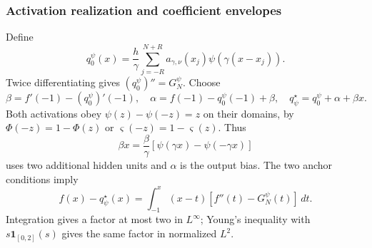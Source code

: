 \subsubsection{Activation realization and coefficient envelopes}
Define
\begin{equation}
 q_0^\psi(x)=\frac h\gamma\sum_{j=-R}^{N+R}
 a_{\gamma,\nu}(x_j)\psi(\gamma(x-x_j)).
 \label{eq:psi-q0}
\end{equation}
Twice differentiating gives $(q_0^\psi)''=G_N^\psi$. Choose
\begin{equation}
 \beta=f'(-1)-(q_0^\psi)'(-1),\quad
 \alpha=f(-1)-q_0^\psi(-1)+\beta,\quad
 q_\psi^\star=q_0^\psi+\alpha+\beta x.
 \label{eq:psi-anchor}
\end{equation}
Both activations obey $\psi(z)-\psi(-z)=z$ on their domains, by
$\Phi(-z)=1-\Phi(z)$ or $\varsigma(-z)=1-\varsigma(z)$.
Thus
\begin{equation}
 \beta x=\frac\beta\gamma[\psi(\gamma x)-\psi(-\gamma x)]
 \label{eq:psi-linear-identity}
\end{equation}
uses two additional hidden units and $\alpha$ is the output bias. The two
anchor conditions imply
\begin{equation}
 f(x)-q_\psi^\star(x)=\int_{-1}^x(x-t)[f''(t)-G_N^\psi(t)]\,dt.
 \label{eq:psi-lift-error}
\end{equation}
Integration gives a factor at most two in $L^\infty$; Young's inequality
with $s\mathbf1_{[0,2]}(s)$ gives the same factor in normalized $L^2$.

